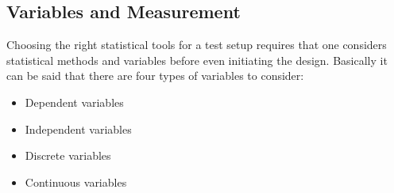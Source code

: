 \subsection{Variables and Measurement}
Choosing the right statistical tools for a test setup requires that one considers statistical methods and variables before even initiating the design. Basically it can be said that there are four types of variables to consider:

\begin{itemize}
  \item Dependent variables
  \item Independent variables
  \item Discrete variables
  \item Continuous variables
\end{itemize}

